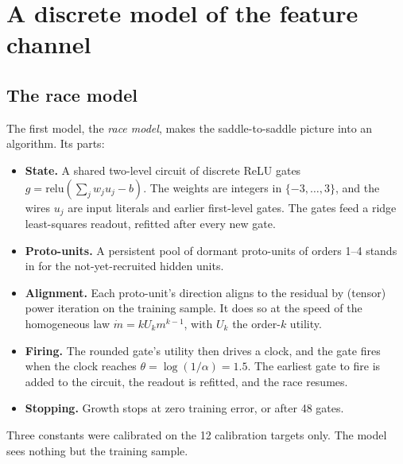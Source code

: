 \section{A discrete model of the feature channel}\label{sec:model}

\subsection{The race model}\label{sec:race}

The first model, the \emph{race model}, makes the saddle-to-saddle picture into an algorithm. Its parts:
\begin{itemize}
\item \textbf{State.} A shared two-level circuit of discrete ReLU gates $g=\mathrm{relu}(\sum_j w_ju_j-b)$. The weights are integers in $\{-3,\dots,3\}$, and the wires $u_j$ are input literals and earlier first-level gates. The gates feed a ridge least-squares readout, refitted after every new gate.
\item \textbf{Proto-units.} A persistent pool of dormant proto-units of orders 1–4 stands in for the not-yet-recruited hidden units.
\item \textbf{Alignment.} Each proto-unit's direction aligns to the residual by (tensor) power iteration on the training sample. It does so at the speed of the homogeneous law $\dot m=kU_km^{k-1}$, with $U_k$ the order-$k$ utility.
\item \textbf{Firing.} The rounded gate's utility then drives a clock, and the gate fires when the clock reaches $\theta=\log(1/\alpha)=1.5$. The earliest gate to fire is added to the circuit, the readout is refitted, and the race resumes.
\item \textbf{Stopping.} Growth stops at zero training error, or after 48 gates.
\end{itemize}
Three constants were calibrated on the 12 calibration targets only. The model sees nothing but the training sample.

